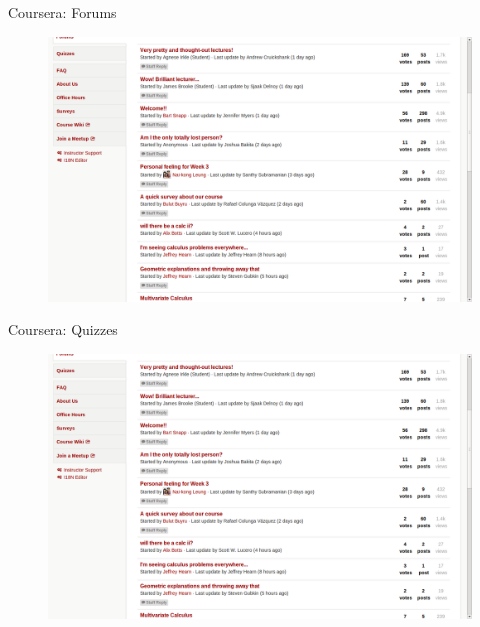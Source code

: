 \documentclass[serif,mathserif,final]{beamer}
\title{\mdseries{Calculus\&}\mooculus}
\author{Jim Fowler, Steve Gubkin, and Bart Snapp}
\institute{The Ohio State University}
\begin{document}
{
\begin{frame}{}
  \begin{columns}[t]

    \begin{column}{0.32\linewidth}

      \begin{block}{Coursera: Forums}
        \begin{figure}[htb]
          \centering
          \includegraphics[width=.9\columnwidth]{forum}
        \end{figure}
        \end{block}

      \begin{block}{Coursera: Quizzes}
        \begin{figure}[htb]
          \centering
          \includegraphics[width=.9\columnwidth]{forum}
        \end{figure}
      \end{block}



\end{column}
\end{columns}
\end{frame}}
\end{document}
